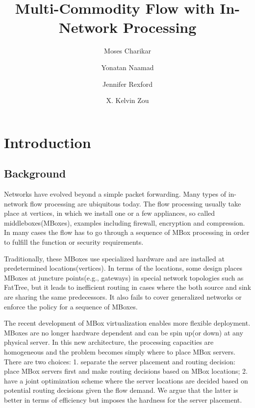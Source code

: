\documentclass[11pt]{article}
\begin{document}
\title{Multi-Commodity Flow with In-Network Processing}
\author[]{Moses Charikar}
\author[]{Yonatan Naamad}
\author[]{Jennifer Rexford}
\author[]{X. Kelvin Zou}
\date{}
\maketitle

\section{Introduction}
\subsection{Background}
Networks have evolved beyond a simple packet forwarding. Many types of in-network flow processing are ubiquitous today. The flow processing usually take place at vertices, in which we install one or a few appliances, so called middleboxes(MBoxes), examples including firewall, encryption and compression. In many cases the flow has to go through a sequence of MBox processing in order to fulfill the function or security requirements. 

Traditionally, these MBoxes use specialized hardware and are installed at predetermined locations(vertices). In terms of the locations, some design places MBoxes at juncture points(e.g., gateways) in special network topologies such as FatTree\cite{FATTREE}, but it leads to inefficient routing in cases where the both source and sink are sharing the same predecessors. It also fails to cover generalized networks or enforce the policy for a sequence of MBoxes.

The recent development of MBox virtualization enables more flexible deployment. MBoxes are no longer hardware dependent and can be spin up(or down) at any physical server\cite{clickos, ANANTA2013}. In this new architecture, the processing capacities are homogeneous and the problem becomes simply where to place MBox servers. There are two choices: 1. separate the server placement and routing decision: place MBox servers first and make routing decisions based on MBox locations\cite{SIMPLE2013}; 2. have a joint optimization scheme where the server locations are decided based on potential routing decisions given the flow demand. We argue that the latter is better in terms of efficiency but imposes the hardness for the server placement. 
\end{document}
